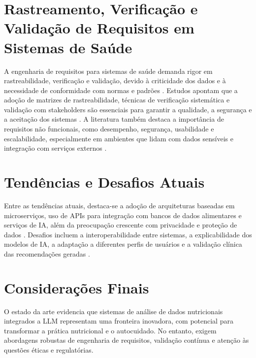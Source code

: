 \section{Rastreamento, Verificação e Validação de Requisitos em Sistemas de Saúde}

A engenharia de requisitos para sistemas de saúde demanda rigor em rastreabilidade, verificação e validação, devido à criticidade dos dados e à necessidade de conformidade com normas e padrões \cite{gotel1994traceability}. Estudos apontam que a adoção de matrizes de rastreabilidade, técnicas de verificação sistemática e validação com stakeholders são essenciais para garantir a qualidade, a segurança e a aceitação dos sistemas \cite{goncalves2004ieee830, pinheiro2003requirements}. A literatura também destaca a importância de requisitos não funcionais, como desempenho, segurança, usabilidade e escalabilidade, especialmente em ambientes que lidam com dados sensíveis e integração com serviços externos \cite{sommerville2003engenharia}.

\section{Tendências e Desafios Atuais}

Entre as tendências atuais, destaca-se a adoção de arquiteturas baseadas em microserviços, uso de APIs para integração com bancos de dados alimentares e serviços de IA, além da preocupação crescente com privacidade e proteção de dados \cite{deng2021microservices, fernandes2022privacidade}. Desafios incluem a interoperabilidade entre sistemas, a explicabilidade dos modelos de IA, a adaptação a diferentes perfis de usuários e a validação clínica das recomendações geradas \cite{holzinger2017we, doshi2017towards}.

\section{Considerações Finais}

O estado da arte evidencia que sistemas de análise de dados nutricionais integrados a LLM representam uma fronteira inovadora, com potencial para transformar a prática nutricional e o autocuidado. No entanto, exigem abordagens robustas de engenharia de requisitos, validação contínua e atenção às questões éticas e regulatórias.

